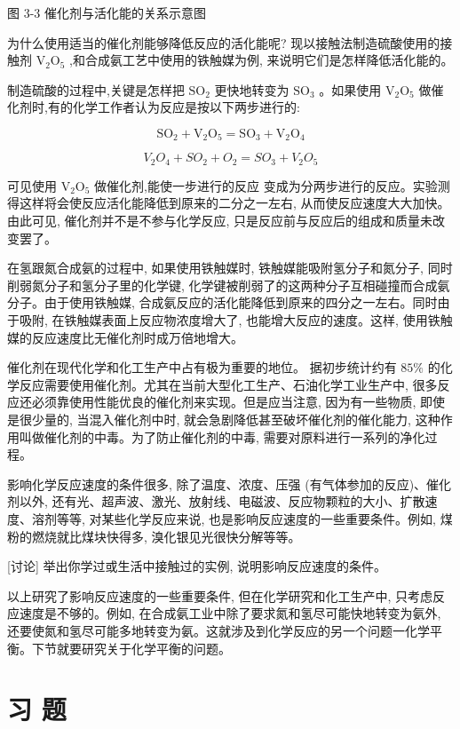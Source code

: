 \documentclass[10pt]{article}
\begin{document}
图 3-3 催化剂与活化能的关系示意图

为什么使用适当的催化剂能够降低反应的活化能呢? 现以接触法制造硫酸使用的接触剂 \({\mathrm{V}}_{2}{\mathrm{O}}_{5}\) ,和合成氨工艺中使用的铁触媒为例, 来说明它们是怎样降低活化能的。

制造硫酸的过程中,关键是怎样把 \({\mathrm{{SO}}}_{2}\) 更快地转变为 \({\mathrm{{SO}}}_{3}\) 。如果使用 \({\mathrm{V}}_{2}{\mathrm{O}}_{5}\) 做催化剂时,有的化学工作者认为反应是按以下两步进行的:

\[
{\mathrm{{SO}}}_{2} + {\mathrm{V}}_{2}{\mathrm{O}}_{5} = {\mathrm{{SO}}}_{3} + {\mathrm{V}}_{2}{\mathrm{O}}_{4}
\]

\[
{V}_{2}{O}_{4} + {SO}_{2} + {O}_{2} = {SO}_{3} + {V}_{2}{O}_{5}
\]

可见使用 \({\mathrm{V}}_{2}{\mathrm{O}}_{5}\) 做催化剂,能使一步进行的反应 变成为分两步进行的反应。实验测得这样将会使反应活化能降低到原来的二分之一左右, 从而使反应速度大大加快。由此可见, 催化剂并不是不参与化学反应, 只是反应前与反应后的组成和质量未改变罢了。

在氢跟氮合成氨的过程中, 如果使用铁触媒时, 铁触媒能吸附氢分子和氮分子, 同时削弱氮分子和氢分子里的化学键, 化学键被削弱了的这两种分子互相碰撞而合成氨分子。由于使用铁触媒, 合成氨反应的活化能降低到原来的四分之一左右。同时由于吸附, 在铁触媒表面上反应物浓度增大了, 也能增大反应的速度。这样, 使用铁触媒的反应速度比无催化剂时成万倍地增大。

催化剂在现代化学和化工生产中占有极为重要的地位。 据初步统计约有 \({85}\%\) 的化学反应需要使用催化剂。尤其在当前大型化工生产、石油化学工业生产中, 很多反应还必须靠使用性能优良的催化剂来实现。但是应当注意, 因为有一些物质, 即使是很少量的, 当混入催化剂中时, 就会急剧降低甚至破坏催化剂的催化能力, 这种作用叫做催化剂的中毒。为了防止催化剂的中毒, 需要对原料进行一系列的净化过程。

影响化学反应速度的条件很多, 除了温度、浓度、压强 (有气体参加的反应)、催化剂以外, 还有光、超声波、激光、放射线、电磁波、反应物颗粒的大小、扩散速度、溶剂等等, 对某些化学反应来说, 也是影响反应速度的一些重要条件。例如, 煤粉的燃烧就比煤块快得多, 溴化银见光很快分解等等。

[讨论] 举出你学过或生活中接触过的实例, 说明影响反应速度的条件。

以上研究了影响反应速度的一些重要条件, 但在化学研究和化工生产中, 只考虑反应速度是不够的。例如, 在合成氨工业中除了要求氮和氢尽可能快地转变为氨外, 还要使氮和氢尽可能多地转变为氨。这就涉及到化学反应的另一个问题一化学平衡。下节就要研究关于化学平衡的问题。

\section*{习 题}
\end{document}

